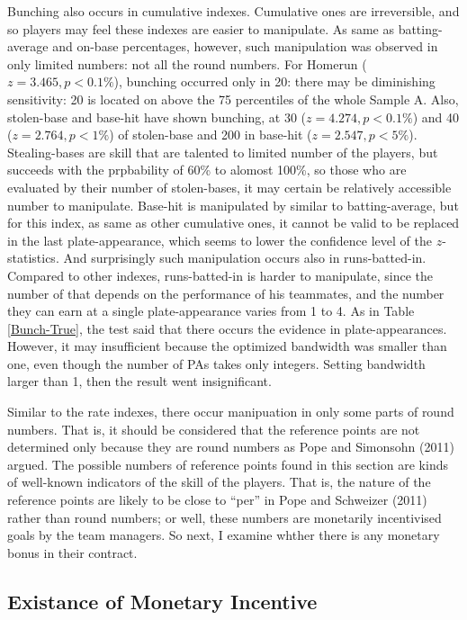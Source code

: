 \documentclass[dvipdfmx, 12pt]{article}
\begin{document}
Bunching also occurs in cumulative indexes. Cumulative ones are irreversible, and so players may feel these indexes are easier to manipulate. As same as batting-average and on-base percentages, however, such manipulation was observed in only limited numbers: not all the round numbers. For Homerun ($z=3.465, p < 0.1\%$), bunching occurred only in 20: there may be diminishing sensitivity: 20 is located on above the 75 percentiles of the whole Sample A. Also, stolen-base and base-hit have shown bunching, at 30 ($z=4.274, p < 0.1\%$) and 40 ($z=2.764, p < 1\%$) of stolen-base and 200 in base-hit ($z=2.547, p < 5\%$). Stealing-bases are skill that are talented to limited number of the players, but succeeds with the prpbability of 60\% to alomost 100\%, so those who are evaluated by their number of stolen-bases, it may certain be relatively accessible number to manipulate. Base-hit is manipulated by similar to batting-average, but for this index, as same as other cumulative ones, it cannot be valid to be replaced in the last plate-appearance, which seems to lower the confidence level of the $z$-statistics. And surprisingly such manipulation occurs also in runs-batted-in. Compared to other indexes, runs-batted-in is harder to manipulate, since the number of that depends on the performance of his teammates, and the number they can earn at a single plate-appearance varies from 1 to 4. As in Table \ref{Bunch-True}, the test said that there occurs the evidence in plate-appearances. However, it may insufficient because the optimized bandwidth was smaller than one, even though the number of PAs takes only integers. Setting bandwidth larger than 1, then the result went insignificant.

Similar to the rate indexes, there occur manipuation in only some parts of round numbers. That is, it should be considered that the reference points are not determined only because they are round numbers as Pope and Simonsohn (2011) argued. The possible numbers of reference points found in this section are kinds of well-known indicators of the skill of the players. That is, the nature of the reference points are likely to be close to ``per'' in Pope and Schweizer (2011) rather than round numbers; or well, these numbers are monetarily incentivised goals by the team managers. So next, I examine whther there is any monetary bonus in their contract.


\subsection{Existance of Monetary Incentive}
\end{document}
